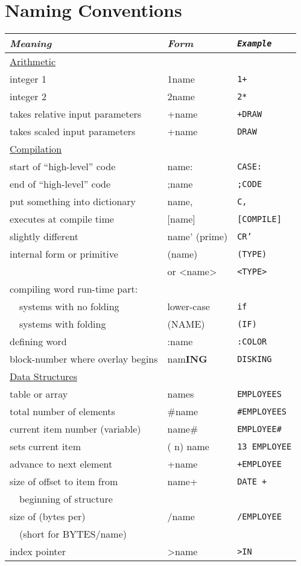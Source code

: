 \section{Naming Conventions}%
%
\begin{longtable}{ll>{\tt}l}
{}{\setlength{\parsep}{0cm}}%
\emph{Meaning}&\emph{Form}&\textrm{\emph{Example}}\\[.5ex] \endhead
\underline{Arithmetic}\\
integer 1&1name&1+\\
integer 2&2name&2*\\
takes relative input parameters&+name&+DRAW\\
takes scaled input parameters&+name&*DRAW\\[0.5ex]
\underline{Compilation}\\
start of ``high-level'' code&name:&CASE:\\
end of ``high-level'' code&;name&;CODE\\
put something into dictionary&name,&C,\\
executes at compile time&[name]&[COMPILE]\\
slightly different&name' (prime)&CR'\\
internal form or primitive&(name)&(TYPE)\\
&or <name>&<TYPE>\\
compiling word run-time part:\\
~~systems with no folding&lower-case&if\\
~~systems with folding&(NAME)&(IF)\\
defining word&:name&:COLOR\\
block-number where overlay begins&nam{\bf ING}&DISKING\\[0.5ex]
\underline{Data Structures}\\
table or array&names&EMPLOYEES\\
total number of elements&\#name&\#EMPLOYEES\\
current item number (variable)&name\#&EMPLOYEE\#\\
sets current item&( n) name&13 EMPLOYEE\\
advance to next element&+name&+EMPLOYEE\\
size of offset to item from&name+&DATE +\\
~~beginning of structure\\
size of (bytes per)&/name&/EMPLOYEE\\
~~(short for BYTES/name)\\
index pointer&>name&>IN\\

\end{longtable}
